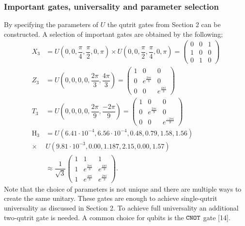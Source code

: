 \subsubsection{Important gates, universality and parameter selection}
By specifying the parameters of $U$ the qutrit gates from Section 2 can be constructed. A selection of important gates are obtained by the following;
\begin{equation}
\begin{aligned}
X_3 &= U(0,0,\dfrac{\pi}{4},\dfrac{\pi}{2},0,\pi)\times U(0,0,\dfrac{\pi}{2},\dfrac{\pi}{4},0,\pi) 
= \begin{pmatrix}
0&0&1
\\
1&0&0
\\
0&1&0
\end{pmatrix}
\\ 
Z_3 &= U(0,0,0,0,\dfrac{2\pi}{3},\dfrac{4\pi}{3})
= \begin{pmatrix}
1&0&0
\\
0&e^{\frac{2\pi i}{3}}&0
\\
0&0&e^{\frac{4\pi i}{3}}
\end{pmatrix}
\\
T_3 &= U(0,0,0,0,\dfrac{2\pi}{9},\dfrac{-2\pi}{9})
= \begin{pmatrix}
1&0&0
\\
0&e^{\frac{2\pi i}{9}}&0
\\
0&0&e^{\frac{-2\pi i}{9}}
\end{pmatrix}
\\
\text{H}_3 &= U(6.41\cdot 10^{-4}, 6.56\cdot 10^{-4}, 0.48, 0.79, 1.58, 1.56)\\ \times &U(9.81\cdot 10^{-3}, 0.00, 1.187, 2.15, 0.00, 1.57)\\
&\approx \dfrac{1}{\sqrt{3}}\begin{pmatrix}
1&1&1
\\
1&e^{\frac{2\pi i}{3}}&e^{\frac{4\pi i}{3}}
\\
1&e^{\frac{4\pi i}{3}}&e^{\frac{2\pi i}{3}}
\end{pmatrix}.
\end{aligned}
\end{equation}
Note that the choice of parameters is not unique and there are multiple ways to create the same unitary. These gates are enough to achieve single-qutrit universality as discussed in Section 2. To achieve full universality an additional two-qutrit gate is needed. A common choice for qubits is the ${\tt CNOT}$ gate [14].

